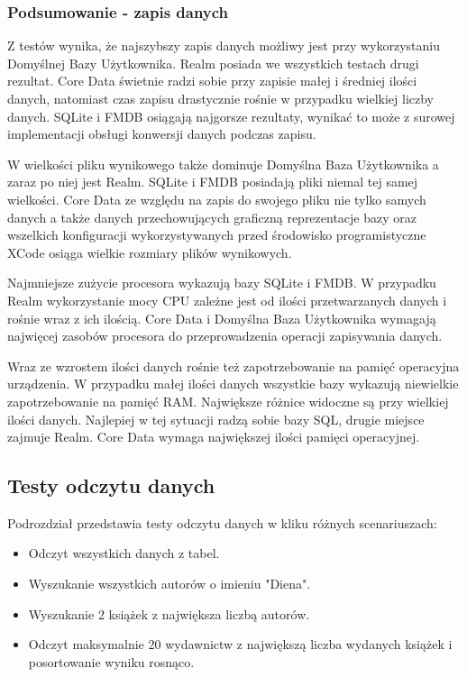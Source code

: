 \subsubsection{Podsumowanie - zapis danych}

Z testów wynika, że najszybszy zapis danych możliwy jest przy wykorzystaniu Domyślnej Bazy Użytkownika. Realm posiada we wszystkich testach drugi rezultat. Core Data świetnie radzi sobie przy zapisie małej i średniej ilości danych, natomiast czas zapisu drastycznie rośnie w przypadku wielkiej liczby danych. SQLite i FMDB osiągają najgorsze rezultaty, wynikać to może z surowej implementacji obsługi konwersji danych podczas zapisu. 

W wielkości pliku wynikowego także dominuje Domyślna Baza Użytkownika a zaraz po niej jest Realm. SQLite i FMDB posiadają pliki niemal tej samej wielkości. Core Data ze względu na zapis do swojego pliku nie tylko samych danych a także danych przechowujących graficzną reprezentacje bazy oraz wszelkich konfiguracji wykorzystywanych przed środowisko programistyczne XCode osiąga wielkie rozmiary plików wynikowych. 

Najmniejsze zużycie procesora wykazują bazy SQLite i FMDB. W przypadku Realm wykorzystanie mocy CPU zależne jest od ilości przetwarzanych danych i rośnie wraz z ich ilością. Core Data i Domyślna Baza Użytkownika wymagają najwięcej zasobów procesora do przeprowadzenia operacji zapisywania danych. 

Wraz ze wzrostem ilości danych rośnie też zapotrzebowanie na pamięć operacyjna urządzenia. W przypadku małej ilości danych wszystkie bazy wykazują niewielkie zapotrzebowanie na pamięć RAM. Największe różnice widoczne są przy wielkiej ilości danych. Najlepiej w tej sytuacji radzą sobie bazy SQL, drugie miejsce zajmuje Realm. Core Data wymaga największej  ilości pamięci operacyjnej. 

\subsection{Testy odczytu danych}

Podrozdział przedstawia testy odczytu danych w kliku różnych scenariuszach: 

\begin{itemize}
\item Odczyt wszystkich danych z tabel.
\item Wyszukanie wszystkich autorów o imieniu "Diena".
\item Wyszukanie 2 książek z największa liczbą autorów.
\item Odczyt maksymalnie 20 wydawnictw z największą liczba wydanych książek i posortowanie wyniku rosnąco.
\end{itemize}


